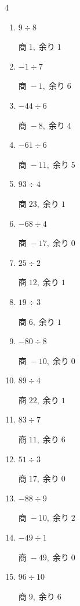 \begin{multicols}{4}
\begin{enumerate}
  \item $9 \div 8$

        $商\; 1,\; 余り\; 1$

\columnbreak %

  \item $-1 \div 7$

        $商\; -1,\; 余り\; 6$

  \item $-44 \div 6$

        $商\; -8,\; 余り\; 4$

  \item $-61 \div 6$

        $商\; -11,\; 余り\; 5$

  \item $93 \div 4$

        $商\; 23,\; 余り\; 1$

  \item $-68 \div 4$

        $商\; -17,\; 余り\; 0$

  \item $25 \div 2$

        $商\; 12,\; 余り\; 1$

  \item $19 \div 3$

        $商\; 6,\; 余り\; 1$

  \item $-80 \div 8$

        $商\; -10,\; 余り\; 0$

  \item $89 \div 4$

        $商\; 22,\; 余り\; 1$

  \item $83 \div 7$

        $商\; 11,\; 余り\; 6$

  \item $51 \div 3$

        $商\; 17,\; 余り\; 0$

  \item $-88 \div 9$

        $商\; -10,\; 余り\; 2$

  \item $-49 \div 1$

        $商\; -49,\; 余り\; 0$

  \item $96 \div 10$

        $商\; 9,\; 余り\; 6$


\end{enumerate}
\end{multicols}
